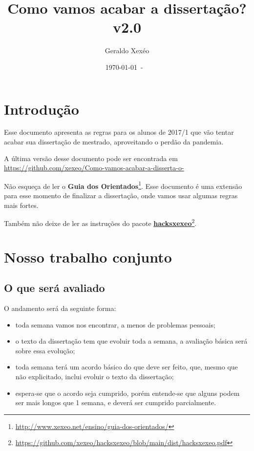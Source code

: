 \documentclass{article}
\title{Como vamos acabar a dissertação? v2.0}
\author{Geraldo Xexéo}
\date{\today\ - \ \currenttime}
\begin{document}
\maketitle
\tableofcontents
\section{Introdução}

Esse documento apresenta as regras para os alunos de 2017/1 que vão tentar acabar sua dissertação de mestrado, aproveitando o perdão da pandemia.

A última versão desse documento pode ser encontrada em \href{https://github.com/xexeo/Como-vamos-acabar-a-disserta-o-}{\url{https://github.com/xexeo/Como-vamos-acabar-a-disserta-o-}}

Não esqueça de ler o \textbf{Guia dos Orientados}\footnote{\url{http://www.xexeo.net/ensino/guia-dos-orientados/}}. Esse documento é uma extensão para esse momento de finalizar a dissertação, onde vamos usar algumas regras mais fortes.

Também não deixe de ler as instruções do pacote \href{https://github.com/xexeo/hacksxexeo/blob/main/dist/hacksxexeo.pdf}{\textbf{hacksxexeo}}\footnote{\url{https://github.com/xexeo/hacksxexeo/blob/main/dist/hacksxexeo.pdf}}.


\section{Nosso trabalho conjunto}

\subsection{O que será avaliado}

O andamento será da seguinte forma:
\begin{itemize}
    \item toda semana vamos nos encontrar, a menos de problemas pessoais;
    \item o texto da dissertação tem que evoluir toda a semana, a avaliação básica será sobre essa evolução;
    \item toda semana terá um acordo básico do que deve ser feito, que, mesmo que não explicitado, inclui evoluir o texto da dissertação;
    \item espera-se que o acordo seja cumprido, porém entende-se que alguns podem ser mais longos que 1 semana, e deverá ser cumprido parcialmente.
\end{itemize}
\end{document}
